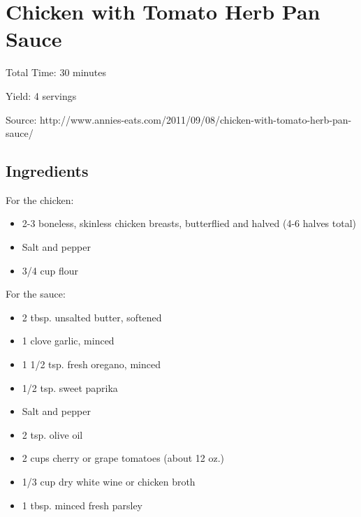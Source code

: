 \section{Chicken with Tomato Herb Pan Sauce}

\begin{center}
\noindent Total Time: 30 minutes

\noindent Yield: 4 servings

\vspace{1em}

Source: http://www.annies-eats.com/2011/09/08/chicken-with-tomato-herb-pan-sauce/
\end{center}

\subsection{Ingredients}
For the chicken:
\begin{itemize}
    \item 2-3 boneless, skinless chicken breasts, butterflied and halved (4-6 halves total)
    \item Salt and pepper
    \item 3/4 cup flour
\end{itemize}

\noindent For the sauce:
\begin{multicols}{2}
\begin{itemize}
    \item 2 tbsp. unsalted butter, softened
    \item 1 clove garlic, minced
    \item 1 1/2 tsp. fresh oregano, minced
    \item 1/2 tsp. sweet paprika
    \item Salt and pepper
    \item 2 tsp. olive oil
    \item 2 cups cherry or grape tomatoes (about 12 oz.)
    \item 1/3 cup dry white wine or chicken broth
    \item 1 tbsp. minced fresh parsley
\end{itemize}
\end{multicols}

